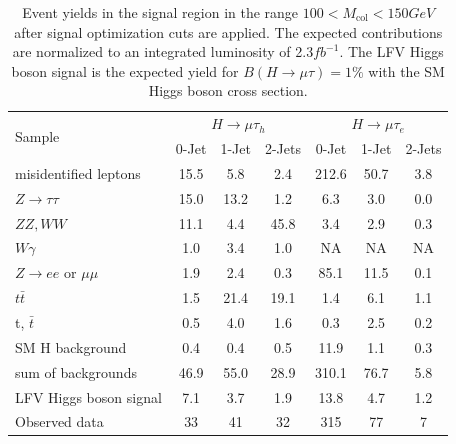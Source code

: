 \documentclass[oneside, letterpaper, oldfontcommands]{memoir}
\begin{document}
 \begin{table}[hbtp]
 \centering  \caption{Event yields in the signal region in the range $100 < M_\text{col} < 150GeV$ after signal optimization cuts are applied. The expected contributions are normalized to an integrated luminosity
of 2.3$fb^{-1}$. The LFV Higgs boson signal is the expected yield for $B(H \rightarrow \mu \tau)=1\%$ with the SM Higgs boson cross section.}
  \label{tab:EventYieldTable_100_to_150_13TeV_Signal}
  \begin{tabular}{lccc|ccc} \hline
        \multirow{2}{*}{Sample}                                & \multicolumn{3}{c}{$H \rightarrow \mu \tau_{h}$}                &     \multicolumn{3}{c}{$H \rightarrow \mu \tau_{e}$}     \\ \cline{2-7}
                                              &  0-Jet            & 1-Jet            & 2-Jets               &  0-Jet             & 1-Jet            & 2-Jets  \\ \hline
    misidentified leptons                    &  15.5  &   5.8     &  2.4 & 212.6 & 50.7 & 3.8\\
    $ Z \rightarrow \tau \tau$                    & 15.0   & 13.2      &  1.2 & 6.3   & 3.0  & 0.0  \\
    $ ZZ,WW$                       & 11.1   &  4.4      &  45.8 & 3.4   & 2.9  & 0.3\\
    $ W\gamma$                             &   1.0  &  3.4      &  1.0 &NA & NA & NA    \\
    $ Z \rightarrow ee$ or $\mu \mu$          &  1.9   &  2.4      &  0.3 & 85.1 & 11.5& 0.1  \\
    $t\bar{t}     $                            &  1.5   & 21.4      & 19.1 &1.4 & 6.1 & 1.1    \\
    t, $\bar{t}$                             &  0.5   &  4.0      &  1.6 &0.3 & 2.5 & 0.2    \\
    SM H background                        &  0.4   &  0.4      &  0.5 &11.9 & 1.1 & 0.3    \\ \hline
    sum of backgrounds                       & 46.9   & 55.0      & 28.9 &310.1& 76.7 & 5.8  \\  \hline
    LFV Higgs boson signal                   &  7.1   &  3.7      &  1.9 &13.8 & 4.7 & 1.2    \\ \hline \hline
      Observed data                          &  33    &  41       &  32  & 315 & 77 & 7 \\ \hline
  \end{tabular}
\end{table}
\end{document}
